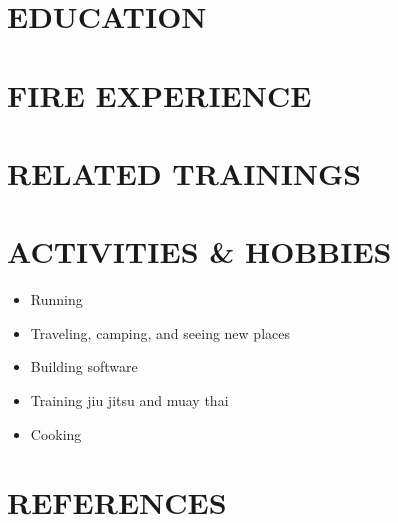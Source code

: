 \documentclass[a4paper,9pt]{extarticle}
\begin{document}
\section*{EDUCATION}
\TAMU

\section*{FIRE EXPERIENCE}
\ArroyoGrandeHelitack
\Sundowners

\FFCertifications

\section*{RELATED TRAININGS}

\FFTrainings

\section*{ACTIVITIES \& HOBBIES}
\begin{itemize}
    \item Running
    \item Traveling, camping, and seeing new places
    \item Building software
    \item Training jiu jitsu and muay thai
    \item Cooking
\end{itemize}

\section*{REFERENCES}
\end{document}
